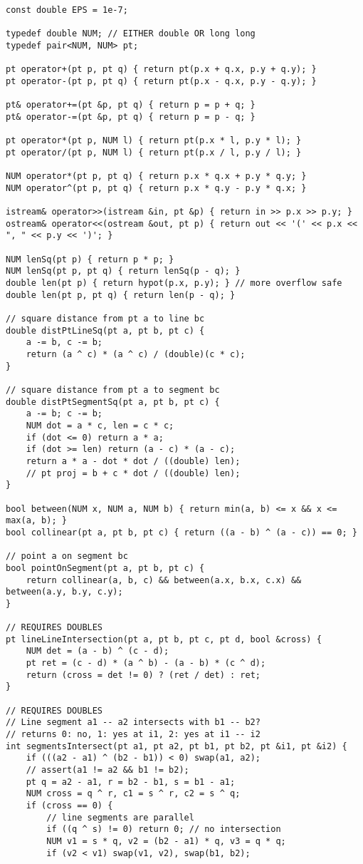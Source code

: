 \documentclass{article}
\begin{document}
\begin{lstlisting}
const double EPS = 1e-7;

typedef double NUM; // EITHER double OR long long
typedef pair<NUM, NUM> pt;

pt operator+(pt p, pt q) { return pt(p.x + q.x, p.y + q.y); }
pt operator-(pt p, pt q) { return pt(p.x - q.x, p.y - q.y); }

pt& operator+=(pt &p, pt q) { return p = p + q; }
pt& operator-=(pt &p, pt q) { return p = p - q; }

pt operator*(pt p, NUM l) { return pt(p.x * l, p.y * l); }
pt operator/(pt p, NUM l) { return pt(p.x / l, p.y / l); }

NUM operator*(pt p, pt q) { return p.x * q.x + p.y * q.y; }
NUM operator^(pt p, pt q) { return p.x * q.y - p.y * q.x; }

istream& operator>>(istream &in, pt &p) { return in >> p.x >> p.y; }
ostream& operator<<(ostream &out, pt p) { return out << '(' << p.x << ", " << p.y << ')'; }

NUM lenSq(pt p) { return p * p; }
NUM lenSq(pt p, pt q) { return lenSq(p - q); }
double len(pt p) { return hypot(p.x, p.y); } // more overflow safe
double len(pt p, pt q) { return len(p - q); }

// square distance from pt a to line bc
double distPtLineSq(pt a, pt b, pt c) {
	a -= b, c -= b;
	return (a ^ c) * (a ^ c) / (double)(c * c);
}

// square distance from pt a to segment bc
double distPtSegmentSq(pt a, pt b, pt c) {
	a -= b; c -= b;
	NUM dot = a * c, len = c * c;
	if (dot <= 0) return a * a;
	if (dot >= len) return (a - c) * (a - c);
	return a * a - dot * dot / ((double) len);
	// pt proj = b + c * dot / ((double) len);
}

bool between(NUM x, NUM a, NUM b) { return min(a, b) <= x && x <= max(a, b); }
bool collinear(pt a, pt b, pt c) { return ((a - b) ^ (a - c)) == 0; }

// point a on segment bc
bool pointOnSegment(pt a, pt b, pt c) {
	return collinear(a, b, c) && between(a.x, b.x, c.x) && between(a.y, b.y, c.y);
}

// REQUIRES DOUBLES
pt lineLineIntersection(pt a, pt b, pt c, pt d, bool &cross) {
	NUM det = (a - b) ^ (c - d);
	pt ret = (c - d) * (a ^ b) - (a - b) * (c ^ d);
	return (cross = det != 0) ? (ret / det) : ret;
}

// REQUIRES DOUBLES
// Line segment a1 -- a2 intersects with b1 -- b2?
// returns 0: no, 1: yes at i1, 2: yes at i1 -- i2
int segmentsIntersect(pt a1, pt a2, pt b1, pt b2, pt &i1, pt &i2) {
	if (((a2 - a1) ^ (b2 - b1)) < 0) swap(a1, a2);
	// assert(a1 != a2 && b1 != b2);
	pt q = a2 - a1, r = b2 - b1, s = b1 - a1;
	NUM cross = q ^ r, c1 = s ^ r, c2 = s ^ q;
	if (cross == 0) {
		// line segments are parallel
		if ((q ^ s) != 0) return 0; // no intersection
		NUM v1 = s * q, v2 = (b2 - a1) * q, v3 = q * q;
		if (v2 < v1) swap(v1, v2), swap(b1, b2);


\end{lstlisting}
\end{document}
